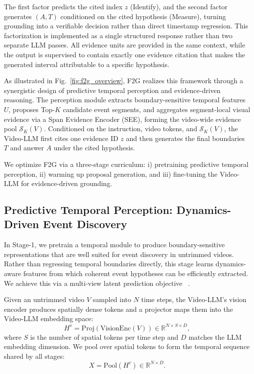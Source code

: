 \documentclass{article}
\theoremstyle{plain}
\theoremstyle{definition}
\theoremstyle{remark}
\begin{document}
The first factor predicts the cited index $z$ (Identify), and the second factor generates $(A,T)$ conditioned on the cited hypothesis (Measure), turning grounding into a verifiable decision rather than direct timestamp regression.
This factorization is implemented as a single structured response rather than two separate LLM passes. All evidence units are provided in the same context, while the output is supervised to contain exactly one evidence citation that makes the generated interval attributable to a specific hypothesis.

As illustrated in Fig.~\ref{fig:f2g_overview}, F2G realizes this framework through a synergistic design of predictive temporal perception and evidence-driven reasoning.
The perception module extracts boundary-sensitive temporal features $U$, proposes Top-$K$ candidate event segments, and aggregates segment-local visual evidence via a Span Evidence Encoder (SEE), forming the video-wide evidence pool $\mathcal{S}_K(V)$.
Conditioned on the instruction, video tokens, and $\mathcal{S}_K(V)$, the Video-LLM first cites one evidence ID $z$ and then generates the final boundaries $T$ and answer $A$ under the cited hypothesis.

We optimize F2G via a three-stage curriculum: i) pretraining predictive temporal perception, ii) warming up proposal generation, and iii) fine-tuning the Video-LLM for evidence-driven grounding.



\subsection{Predictive Temporal Perception: Dynamics-Driven Event Discovery}
\label{sec:perception}

In Stage-1, we pretrain a temporal module to produce boundary-sensitive representations that are
well suited for event discovery in untrimmed videos. Rather than regressing temporal boundaries
directly, this stage learns dynamics-aware features from which coherent event hypotheses can be
efficiently extracted. We achieve this via a multi-view latent prediction objective
~\cite{VJEPA,VJEPA2,LeJEPA}.

Given an untrimmed video $V$ sampled into $N$ time steps, the Video-LLM's vision encoder produces spatially dense tokens and a projector maps them into the Video-LLM embedding space:
\begin{equation}
H^{v}=\mathrm{Proj}(\mathrm{VisionEnc}(V))\in\mathbb{R}^{N\times S\times D},
\end{equation}
where $S$ is the number of spatial tokens per time step and $D$ matches the LLM embedding dimension.
We pool over spatial tokens to form the temporal sequence shared by all stages:
\begin{equation}
X=\mathrm{Pool}(H^{v})\in\mathbb{R}^{N\times D}.
\label{eq:pool_to_X}
\end{equation}
\end{document}
